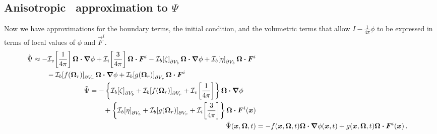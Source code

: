 \subsection{Anisotropic \Pone\ approximation to \texorpdfstring{$\Psi$}{Psi}}

Now we have approximations for the boundary terms, the initial condition, and
the volumetric terms that allow $I-\frac{1}{4\pi}\phi$ to be expressed in terms
of local values of $\phi$ and $\vec{F}^i$.
\begin{align} \nonumber
\begin{split}
 \tilde\Psi
 &\approx 
 - \lopinv{v}{\frac{1}{4\pi}} \vec{\Omega}\vd \grad \phi
 + \lopinv{i}{\frac{3}{4\pi}} \vec{\Omega}\vd \vec{F}^i
 - \lopinv{b}{\zeta}_{\partial V_b} \vec{\Omega}\vd \grad \phi
 + \lopinv{b}{\eta}_{\partial V_b} \vec{\Omega}\vd \vec{F}^i
 \\&\qquad
 - \lopinv{b}{f(\vec{\Omega}_r)}_{\partial V_r} \vec{\Omega}\vd \grad \phi
 + \lopinv{b}{g(\vec{\Omega}_r)}_{\partial V_r} \vec{\Omega}\vd \vec{F}^i
\end{split}
\\
\begin{split}
 \tilde\Psi &= 
- \left\{
  \lopinv{b}{\zeta}_{\partial V_b} 
+ \lopinv{b}{f(\vec{\Omega}_r)}_{\partial V_r}
+ \lopinv{v}{\frac{1}{4\pi}}
\right\} \vec{\Omega}\vd \grad \phi
 \\&\qquad
+ \left\{
  \lopinv{b}{\eta}_{\partial V_b} 
+ \lopinv{b}{g(\vec{\Omega}_r)}_{\partial V_r}
+ \lopinv{i}{\frac{3}{4\pi}}
\right\} \vec{\Omega}\vd \vec{F}^i(\vec{x})
\end{split}
\\ \label{eq:ap1approxPsi3}
\tilde\Psi(\vec{x}, \vec{\Omega}, t)
&= - f(\vec{x}, \vec{\Omega}, t) \vec{\Omega}\vd \grad \phi(\vec{x}, t)
+ g(\vec{x}, \vec{\Omega}, t) \vec{\Omega}\vd \vec{F}^i(\vec{x}) \,.
\end{align}

